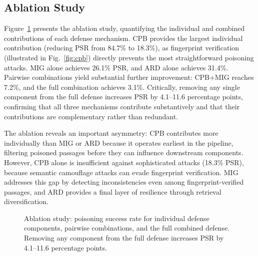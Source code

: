 \documentclass[journal,10pt]{IEEEtran}
\begin{document}
\subsection{Ablation Study}

Figure~\ref{fig:ablation} presents the ablation study, quantifying the individual and combined contributions of each defense mechanism. CPB provides the largest individual contribution (reducing PSR from 84.7\% to 18.3\%), as fingerprint verification (illustrated in Fig.~\ref{fig:cpb}) directly prevents the most straightforward poisoning attacks. MIG alone achieves 26.1\% PSR, and ARD alone achieves 31.4\%. Pairwise combinations yield substantial further improvement: CPB+MIG reaches 7.2\%, and the full combination achieves 3.1\%. Critically, removing any single component from the full defense increases PSR by 4.1--11.6 percentage points, confirming that all three mechanisms contribute substantively and that their contributions are complementary rather than redundant.

The ablation reveals an important asymmetry: CPB contributes more individually than MIG or ARD because it operates earliest in the pipeline, filtering poisoned passages before they can influence downstream components. However, CPB alone is insufficient against sophisticated attacks (18.3\% PSR), because semantic camouflage attacks can evade fingerprint verification. MIG addresses this gap by detecting inconsistencies even among fingerprint-verified passages, and ARD provides a final layer of resilience through retrieval diversification.

\begin{figure}[t]
\centering
{}
\caption{Ablation study: poisoning success rate for individual defense components, pairwise combinations, and the full combined defense. Removing any component from the full defense increases PSR by 4.1--11.6 percentage points.}
\label{fig:ablation}
\end{figure}
\end{document}
